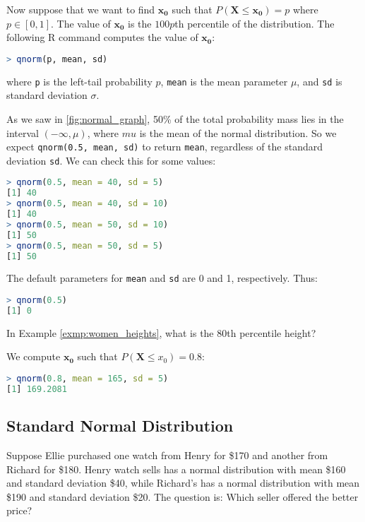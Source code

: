 Now suppose that we want to find \( \bm{x_0} \) such that \( P(\bm{X} \leq \bm{x_0}) = p \) where \( p \in [0, 1] \).
The value of \( \bm{x_0} \) is the \( 100p \)th percentile of the distribution.
The following R command computes the value of \( \bm{x_0} \):
\begin{lstlisting}[language=R]
> qnorm(p, mean, sd)
\end{lstlisting}
where \verb|p| is the left-tail probability  \( p \), \verb|mean| is the mean parameter \( \mu \), and \verb|sd| is standard deviation \( \sigma \).
\begin{exmp}
    As we saw in \autoref{fig:normal_graph}, 50\% of the total probability mass lies in the interval \( (-\infty, \mu) \), where \( mu \) is the mean of the normal distribution.
    So we expect \verb|qnorm(0.5, mean, sd)| to return \verb|mean|, regardless of the standard deviation \verb|sd|.
    We can check this for some values:
    \begin{lstlisting}[language=R]
> qnorm(0.5, mean = 40, sd = 5)
[1] 40
> qnorm(0.5, mean = 40, sd = 10)
[1] 40
> qnorm(0.5, mean = 50, sd = 10)
[1] 50
> qnorm(0.5, mean = 50, sd = 5)
[1] 50
    \end{lstlisting}
    The default parameters for \verb|mean| and \verb|sd| are 0 and 1, respectively. Thus:
    \begin{lstlisting}[language=R]
> qnorm(0.5)
[1] 0
    \end{lstlisting}
\end{exmp}
\begin{exmp}
    In Example \autoref{exmp:women_heights}, what is the 80th percentile height?
\end{exmp}
\begin{solution}
    We compute \( \bm{x_0} \) such that \( P(\bm{X} \leq x_0) = 0.8 \):
    \begin{lstlisting}[language=R]
> qnorm(0.8, mean = 165, sd = 5)
[1] 169.2081        
    \end{lstlisting}
\end{solution}

\subsection{Standard Normal Distribution}

Suppose Ellie purchased one watch from Henry for \$170 and another from Richard for \$180.
Henry watch sells has a normal distribution with mean \$160 and standard deviation \$40,
while Richard's has a normal distribution with mean \$190 and standard deviation \$20.
The question is: Which seller offered the better price?

